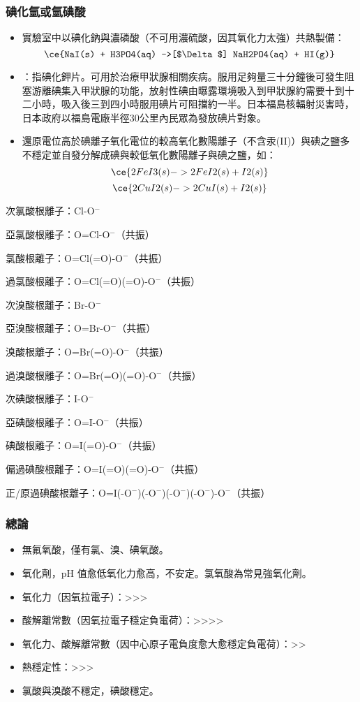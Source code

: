 \documentclass[a4paper,12pt]{report}
\begin{document}
\subsubsection{碘化氫或氫碘酸}
\begin{itemize}
\item 實驗室中以碘化鈉與濃磷酸（不可用濃硫酸，因其氧化力太強）共熱製備：
\[\ce{NaI(s) + H3PO4(aq) ->[$\Delta$] NaH2PO4(aq) + HI(g)}\]
\item {}：指碘化鉀片。可用於治療甲狀腺相關疾病。服用足夠量三十分鐘後可發生阻塞游離碘集入甲狀腺的功能，放射性碘由曝露環境吸入到甲狀腺約需要十到十二小時，吸入後三到四小時服用碘片可阻擋約一半。日本福島核輻射災害時，日本政府以福島電廠半徑30公里內民眾為發放碘片對象。
\item 還原電位高於碘離子氧化電位的較高氧化數陽離子（不含汞(II)）與碘之鹽多不穩定並自發分解成碘與較低氧化數陽離子與碘之鹽，如：
\[\ce{2FeI3(s) -> 2FeI2(s) + I2(s)}\]
\[\ce{2CuI2(s) -> 2CuI(s) + I2(s)}\]
\end{itemize}
\bit
\item 次氯酸根離子：Cl-O$^-$
\item 亞氯酸根離子：O=Cl-O$^-$（共振）
\item 氯酸根離子：O=Cl(=O)-O$^-$（共振）
\item 過氯酸根離子：O=Cl(=O)(=O)-O$^-$（共振）
\item 次溴酸根離子：Br-O$^-$
\item 亞溴酸根離子：O=Br-O$^-$（共振）
\item 溴酸根離子：O=Br(=O)-O$^-$（共振）
\item 過溴酸根離子：O=Br(=O)(=O)-O$^-$（共振）
\item 次碘酸根離子：I-O$^-$
\item 亞碘酸根離子：O=I-O$^-$（共振）
\item 碘酸根離子：O=I(=O)-O$^-$（共振）
\item 偏過碘酸根離子：O=I(=O)(=O)-O$^-$（共振）
\item 正/原過碘酸根離子：O=I(-O$^-$)(-O$^-$)(-O$^-$)(-O$^-$)-O$^-$（共振）
\eit
\subsubsection{總論}
\begin{itemize}
\item 無氟氧酸，僅有氯、溴、碘氧酸。
\item 氧化劑，pH 值愈低氧化力愈高，不安定。氯氧酸為常見強氧化劑。
\item 氧化力（因氧拉電子）：>>>
\item 酸解離常數（因氧拉電子穩定負電荷）：>>>>
\item 氧化力、酸解離常數（因中心原子電負度愈大愈穩定負電荷）：>>
\item 熱穩定性：>>>
\item 氯酸與溴酸不穩定，碘酸穩定。
\end{itemize}
\end{document}
